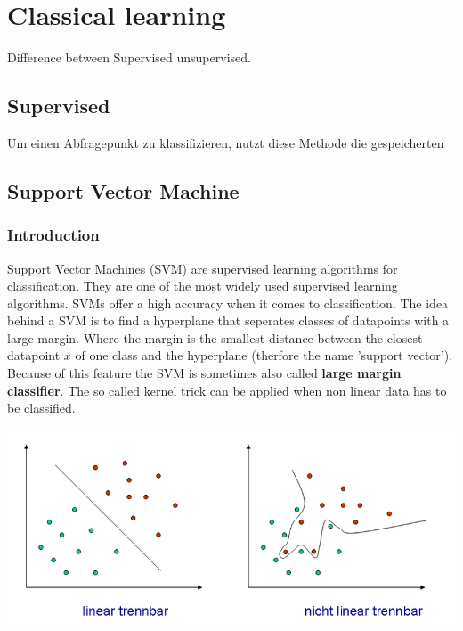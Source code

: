 \section{Classical learning}
Difference between Supervised unsupervised.



\subsection{Supervised}
Um einen Abfragepunkt zu klassifizieren, nutzt diese Methode die gespeicherten


\subsection{Support Vector Machine}
\subsubsection{Introduction}

Support Vector Machines (SVM) are supervised learning algorithms for classification.
They are one of the most widely used supervised learning algorithms. 
SVMs offer a high accuracy when it comes to classification.
The idea behind a SVM is to find a hyperplane that seperates classes of datapoints with a large margin. Where the margin is the smallest distance between the closest datapoint $x$ of one class and the hyperplane (therfore the name 'support vector'). Because of this feature the SVM is sometimes also called \textbf{large margin classifier}.
The so called kernel trick can be applied when non linear data has to be classified.

\includegraphics[scale=0.5]{Images/svm.png}


